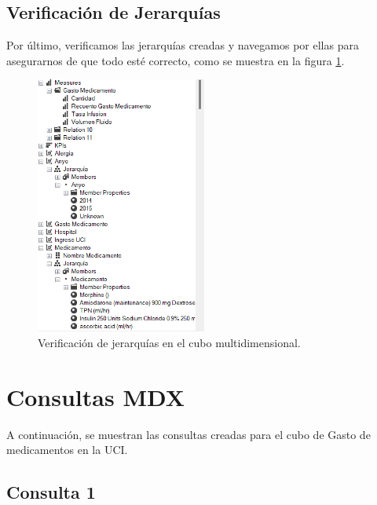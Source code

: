 \documentclass{article}
\begin{document}
\subsection{Verificación de Jerarquías}
Por último, verificamos las jerarquías creadas y navegamos por ellas para asegurarnos de que todo esté correcto, como se muestra en la figura \ref{fig:jerarquia}. 

\begin{figure}[H]
	\begin{center}
		\includegraphics[width=0.5\textwidth]{images/navegacion.png}
		\caption{Verificación de jerarquías en el cubo multidimensional.}
		\label{fig:jerarquia}
	\end{center}
\end{figure}





	
	
	
	
	
	
	
	
	
	
	\section{Consultas MDX}
	A continuación, se muestran las consultas creadas para el cubo de Gasto de medicamentos en la UCI.

\subsection{Consulta 1}
\end{document}
